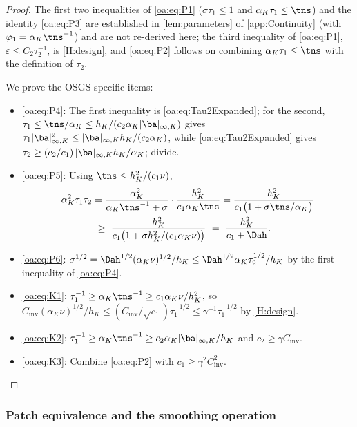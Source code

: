 \begin{proof}
The first two inequalities of \cref{oa:eq:P1} ($\sigma\tau_1\le1$ and $\alpha_K\tau_1\le\tns$)
and the identity \cref{oa:eq:P3} are established in \cref{lem:parameters} of
\cref{app:Continuity} (with $\varphi_1=\alpha_K\tns^{-1}$) and are not re-derived here; the
third inequality of \cref{oa:eq:P1}, $\varepsilon\le C_2\tau_2^{-1}$, is \cref{H:design}, and
\cref{oa:eq:P2} follows on combining $\alpha_K\tau_1\le\tns$ with the definition of $\tau_2$.

We prove the OSGS{\hyp}specific items:
\begin{itemize}[leftmargin=*]
  \item \cref{oa:eq:P4}: The first inequality is \cref{oa:eq:Tau2Expanded}; for the second, $\tau_1 \le \tns/\alpha_K \le h_K/(c_2\alpha_K|\ba|_{\infty,K})$ gives $\tau_1|\ba|_{\infty,K}^2 \le |\ba|_{\infty,K}h_K/(c_2\alpha_K)$, while \cref{oa:eq:Tau2Expanded} gives $\tau_2 \ge (c_2/c_1)\,|\ba|_{\infty,K}h_K/\alpha_K$; divide.
  \item \cref{oa:eq:P5}: Using $\tns \le h_K^2/(c_1\nu)$,
\[
\begin{aligned}
  \alpha_K^2\tau_1\tau_2
  &= \frac{\alpha_K^2}{\alpha_K\tns^{-1}+\sigma}\cdot\frac{h_K^2}{c_1\alpha_K\tns}
  = \frac{h_K^2}{c_1\bigl(1 + \sigma\tns/\alpha_K\bigr)} \\
  &\ \ge\ \frac{h_K^2}{c_1\bigl(1 + \sigma h_K^2/(c_1\alpha_K\nu)\bigr)}
  \ =\ \frac{h_K^2}{c_1 + \Dah}.
\end{aligned}
\]
  \item \cref{oa:eq:P6}: $\sigma^{1/2} = \Dah^{1/2}(\alpha_K\nu)^{1/2}/h_K \le \Dah^{1/2}\alpha_K\tau_2^{1/2}/h_K$ by the first inequality of \cref{oa:eq:P4}.
  \item \cref{oa:eq:K1}: $\tau_1^{-1} \ge \alpha_K\tns^{-1} \ge c_1\alpha_K\nu/h_K^2$, so $C_{\mathrm{inv}}(\alpha_K\nu)^{1/2}/h_K \le (C_{\mathrm{inv}}/\sqrt{c_1})\tau_1^{-1/2} \le \gamma^{-1}\tau_1^{-1/2}$ by \cref{H:design}.
  \item \cref{oa:eq:K2}: $\tau_1^{-1} \ge \alpha_K\tns^{-1} \ge c_2\alpha_K|\ba|_{\infty,K}/h_K$ and $c_2 \ge \gamma C_{\mathrm{inv}}$.
  \item \cref{oa:eq:K3}: Combine \cref{oa:eq:P2} with $c_1 \ge \gamma^2C_{\mathrm{inv}}^2$.
\end{itemize}
\end{proof}

\subsubsection{Patch equivalence and the smoothing operation}

